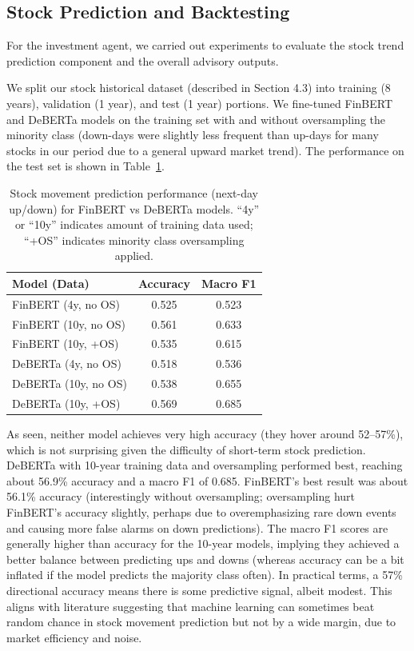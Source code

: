 \documentclass{scrartcl}
\begin{document}
\subsection{Stock Prediction and Backtesting}
For the investment agent, we carried out experiments to evaluate the stock trend prediction component and the overall advisory outputs.

We split our stock historical dataset (described in Section 4.3) into training (8 years), validation (1 year), and test (1 year) portions. We fine-tuned FinBERT and DeBERTa models on the training set with and without oversampling the minority class (down-days were slightly less frequent than up-days for many stocks in our period due to a general upward market trend). The performance on the test set is shown in Table~\ref{tab:stock_perf}.

\begin{table}[ht]
    \centering
    \begin{tabular}{lcc}
        \toprule
        \textbf{Model (Data)} & \textbf{Accuracy} & \textbf{Macro F1} \\
        \midrule
        FinBERT (4y, no OS) & 0.525 & 0.523 \\
        FinBERT (10y, no OS) & 0.561 & 0.633 \\
        FinBERT (10y, +OS) & 0.535 & 0.615 \\
        DeBERTa (4y, no OS) & 0.518 & 0.536 \\
        DeBERTa (10y, no OS) & 0.538 & 0.655 \\
        DeBERTa (10y, +OS) & 0.569 & 0.685 \\
        \bottomrule
    \end{tabular}
    \caption{Stock movement prediction performance (next-day up/down) for FinBERT vs DeBERTa models. “4y” or “10y” indicates amount of training data used; “+OS” indicates minority class oversampling applied.}
    \label{tab:stock_perf}
\end{table}

As seen, neither model achieves very high accuracy (they hover around 52–57\%), which is not surprising given the difficulty of short-term stock prediction. DeBERTa with 10-year training data and oversampling performed best, reaching about 56.9\% accuracy and a macro F1 of 0.685. FinBERT’s best result was about 56.1\% accuracy (interestingly without oversampling; oversampling hurt FinBERT’s accuracy slightly, perhaps due to overemphasizing rare down events and causing more false alarms on down predictions). The macro F1 scores are generally higher than accuracy for the 10-year models, implying they achieved a better balance between predicting ups and downs (whereas accuracy can be a bit inflated if the model predicts the majority class often). In practical terms, a 57\% directional accuracy means there is some predictive signal, albeit modest. This aligns with literature suggesting that machine learning can sometimes beat random chance in stock movement prediction but not by a wide margin, due to market efficiency and noise.
\end{document}
